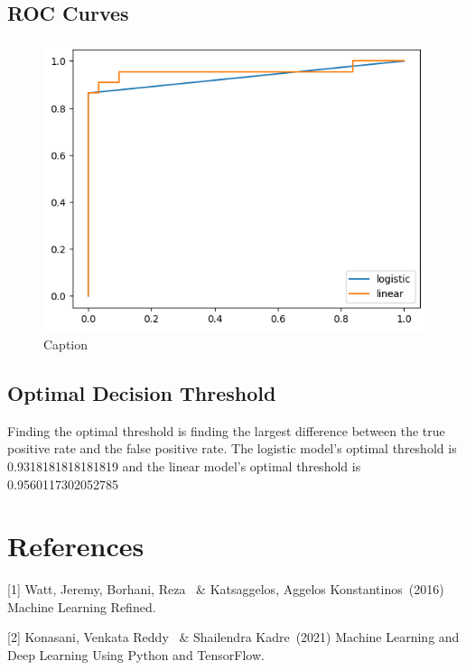 \documentclass{article}
\begin{document}
\subsection{ROC Curves}
\begin{figure}[!ht]
    \centering
    \includegraphics{roc.png}
    \caption{Caption}
\end{figure}

\subsection{Optimal Decision Threshold}
Finding the optimal threshold is finding the largest difference between the true positive rate and the false positive rate. 
The logistic model's optimal threshold is 0.9318181818181819 and the linear model's optimal threshold is 0.9560117302052785

\section*{References}
{
\small
[1] Watt, Jeremy, Borhani, Reza \ \& Katsaggelos, Aggelos Konstantinos\ (2016) Machine Learning Refined.

[2] Konasani, Venkata Reddy \ \& Shailendra Kadre\ (2021) Machine Learning and Deep Learning Using Python and TensorFlow.
}
\end{document}

